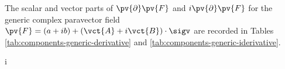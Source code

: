 \noindent The scalar and vector parts of \(\pv{\partial}\pv{F}\) and \(i\pv{\partial}\pv{F}\) for the generic complex paravector field \(\pv{F}=(a+ib)+(\vct{A}+i\vct{B})\cdot\sigv\) are recorded in Tables \ref{tab:components-generic-derivative} and \ref{tab:components-generic-iderivative}.
\begin{componenttable}{\pv{\partial} }
\end{componenttable}

\begin{componenttable}{i\,\pv{\partial} }
\end{componenttable}
